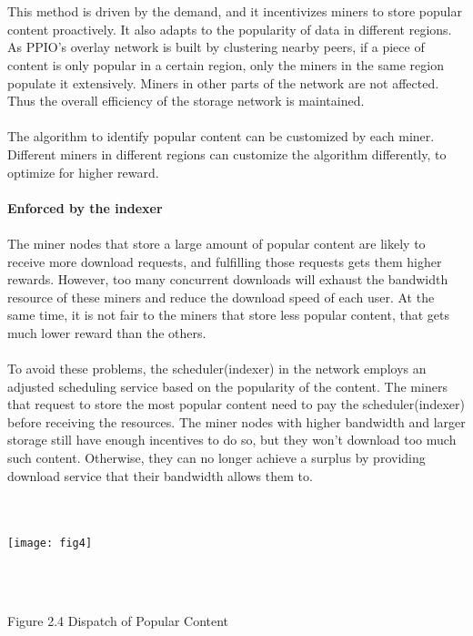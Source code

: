 \documentclass[10pt,a4paper]{article}
\begin{document}
\vspace{-0.5em}
\\ \\This method is driven by the demand, and it incentivizes miners to store popular content proactively. It also adapts to the popularity of data in different regions. As PPIO’s overlay network is built by clustering nearby peers, if a piece of content is only popular in a certain region, only the miners in the same region populate it extensively. Miners in other parts of the network are not affected. Thus the overall efficiency of the storage network is maintained.
\vspace{-0.5em}
\\ \\The algorithm to identify popular content can be customized by each miner. Different miners in different regions can customize the algorithm differently, to optimize for higher reward.
\vspace{-0.5em}
\\ \\{\bf Enforced by the indexer}
\vspace{-0.5em}
\\ \\The miner nodes that store a large amount of popular content are likely to receive more download requests, and fulfilling those requests gets them higher rewards. However, too many concurrent downloads will exhaust the bandwidth resource of these miners and reduce the download speed of each user. At the same time, it is not fair to the miners that store less popular content, that gets much lower reward than the others. 
\vspace{-0.5em}
\\ \\To avoid these problems, the scheduler(indexer) in the network employs an adjusted scheduling service based on the popularity of the content. The miners that request to store the most popular content need to pay the scheduler(indexer) before receiving the resources. The miner nodes with higher bandwidth and larger storage still have enough incentives to do so, but they won’t download too much such content. Otherwise, they can no longer achieve a surplus by providing download service that their bandwidth allows them to.
\vspace{-0.7em}
 \\ \\\\
\centerline{\texttt{[image: fig4]}}
\\\\\centerline{{Figure 2.4 Dispatch of Popular Content}}
\end{document}
